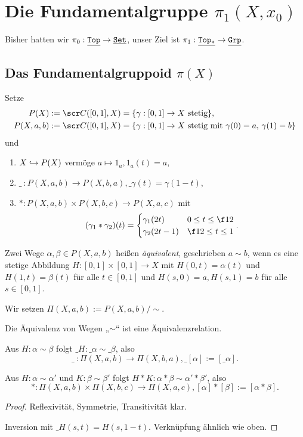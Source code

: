 \chapter{Die Fundamentalgruppe \texorpdfstring{$\pi_1(X, x_0)$}{π₁(X, x₀)}}



Bisher hatten wir $\pi_0: \underline{\mathtt{Top}} \to \underline{\mathtt{Set}}$, unser Ziel ist $\pi_1: \underline{\mathtt{Top_*}} \to \underline{\mathtt{Grp}}$.


\section{Das Fundamentalgruppoid \texorpdfstring{$\pi(X)$}{π(X)}}


\begin{df}
	Setze
	\begin{align*}
		P(X) &:= \scr C([0,1], X) = \{ \gamma : [0,1] \to X \text{ stetig} \}, \\
		P(X,a,b) &:= \scr C([0,1], X) = \{ \gamma : [0,1] \to X \text{ stetig mit $\gamma(0) = a$, $\gamma(1) = b$} \}
	\end{align*}
	und
	\begin{enumerate}[(1)]
		\item
			$X \hookrightarrow P(X)$ vermöge $a \mapsto 1_a, 1_a(t) = a$,
		\item
			$\_{\ }:P(X,a,b) \to P(X,b,a), \_\gamma(t) = \gamma(1-t)$,
		\item
			$*: P(X,a,b) \times P(X,b,c) \to P(X,a,c)$ mit
			\[
				(\gamma_1 * \gamma_2)(t) = \begin{cases}
					\gamma_1(2t) & 0 \le t \le \f 12 \\
					\gamma_2(2t-1) & \f 12 \le t \le 1
				\end{cases}.
			\]
	\end{enumerate}
\end{df}

\begin{df}
	Zwei Wege $\alpha, \beta \in P(X,a,b)$ heißen \emph{äquivalent}, geschrieben $a \sim b$, wenn es eine stetige Abbildung $H: [0,1] \times [0,1] \to X$ mit $H(0,t) = \alpha(t)$ und $H(1,t) = \beta(t)$ für alle $t \in [0,1]$ und $H(s,0) = a, H(s, 1) = b$ für alle $s \in [0,1]$.

	Wir setzen $\Pi(X,a,b) := P(X,a,b) / \sim$.
\end{df}



\begin{prop}
	Die Äquivalenz von Wegen „$\sim$“ ist eine Äquivalenzrelation.

	Aus $H: \alpha \sim \beta$ folgt $\_H: \_\alpha \sim \_\beta$, also
	\[
		\_{\ }: \Pi(X, a, b) \to \Pi(X, b, a), \_{[\alpha]} := [\_\alpha].
	\]

	Aus $H: \alpha \sim \alpha'$ und $K: \beta \sim \beta'$ folgt $H*K: \alpha * \beta \sim \alpha'*\beta'$, also
	\[
		*: \Pi(X, a, b) \times \Pi(X, b, c) \to \Pi(X, a, c), [\alpha] * [\beta] := [\alpha * \beta].
	\]
	\begin{proof}
		Reflexivität, Symmetrie, Transitivität klar.

		Inversion mit $\_H(s,t) = H(s,1-t)$.
		Verknüpfung ähnlich wie oben.
	\end{proof}
\end{prop}

